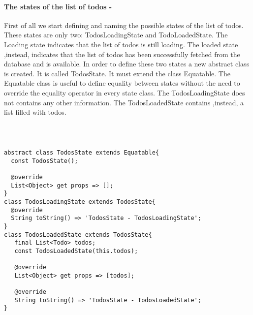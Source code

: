 \paragraph{The states of the list of todos - }
\label{subpar:todo_app_bloc_core_state}
First of all we start defining and naming the possible states of the list of todos. These states are only two: TodosLoadingState and TodoLoadedState. The Loading state indicates that the list of todos is still loading. The loaded state ,instead, indicates that the list of todos has been successfully fetched from the database and is available. In order to define these two states a new abstract class is created. It is called TodosState. It must extend the class Equatable. The  Equatable class is useful to define equality between states without the need to override the equality operator in every state class. The TodosLoadingState does not contains any other information. The TodosLoadedState contains ,instead, a list filled with todos.
\begin{code}
\mbox{}\\
 \mbox{}
\label{code:2.14}
\begin{verbatim}

abstract class TodosState extends Equatable{
  const TodosState();

  @override
  List<Object> get props => [];
}
class TodosLoadingState extends TodosState{
  @override
  String toString() => 'TodosState - TodosLoadingState';
}
class TodosLoadedState extends TodosState{
   final List<Todo> todos;
   const TodosLoadedState(this.todos);

   @override
   List<Object> get props => [todos];

   @override
   String toString() => 'TodosState - TodosLoadedState';
} 
\end{verbatim}
\mbox{}
\end{code}


